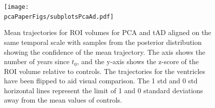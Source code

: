 \begin{figure}
 \centering
 \texttt{[image: \\pcaPaperFigs/subplotsPcaAd.pdf]}
 \caption[PCA and tAD trajectories aligned in the same space, with samples from the posterior distribution]{Mean trajectories for ROI volumes for PCA and tAD aligned on the same temporal scale with samples from the posterior distribution showing the confidence of the mean trajectory. The axis shows the number of years since $t_0$, and the y-axis shows the z-score of the ROI volume relative to controls. The trajectories for the ventricles have been flipped to aid visual comparison. The 1 std and 0 std horizontal lines represent the limit of 1 and 0 standard deviations away from the mean values of controls.}
 \label{fig:trajDEMPcaAdConf}
\end{figure}

